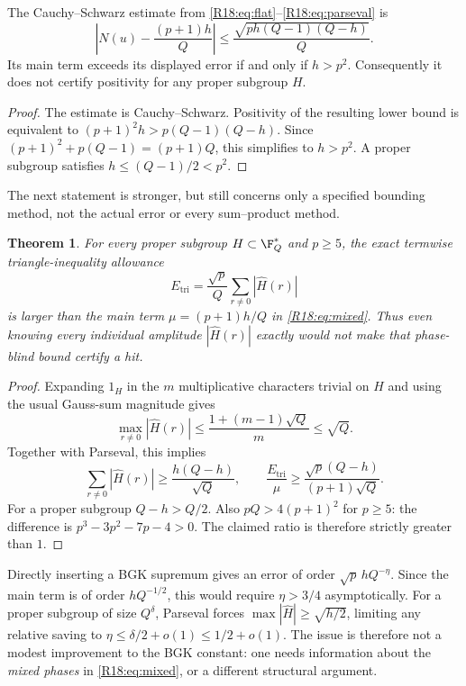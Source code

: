 \documentclass[11pt,a4paper]{article}
\newtheorem{theorem}{Theorem}[section]
\theoremstyle{definition}\newtheorem{definition}[theorem]{Definition}
\theoremstyle{remark}\newtheorem{remark}[theorem]{Remark}
\begin{document}
\begin{proposition}\label{R18:prop:cs}
The Cauchy--Schwarz estimate from \eqref{R18:eq:flat}--\eqref{R18:eq:parseval} is
\[
 \left|N(u)-\frac{(p+1)h}{Q}\right|
 \le\frac{\sqrt{ph(Q-1)(Q-h)}}{Q}.
\]
Its main term exceeds its displayed error if and only if $h>p^2$.
Consequently it does not certify positivity for any proper subgroup $H$.
\end{proposition}
\begin{proof}
The estimate is Cauchy--Schwarz. Positivity of the resulting lower bound
is equivalent to
$(p+1)^2h>p(Q-1)(Q-h)$.
Since $(p+1)^2+p(Q-1)=(p+1)Q$, this simplifies to $h>p^2$.
A proper subgroup satisfies $h\le(Q-1)/2<p^2$.
\end{proof}

The next statement is stronger, but still concerns only a specified
bounding method, not the actual error or every sum--product method.

\begin{theorem}\label{R18:thm:triangle}
For every proper subgroup $H\subset\F_Q^*$ and $p\ge5$, the exact
termwise triangle-inequality allowance
\[
 E_{\mathrm{tri}}=\frac{\sqrt p}{Q}
                       \sum_{r\ne0}|\widehat H(r)|
\]
is larger than the main term $\mu=(p+1)h/Q$ in \eqref{R18:eq:mixed}.
Thus even knowing every individual amplitude $|\widehat H(r)|$
exactly would not make that phase-blind bound certify a hit.
\end{theorem}
\begin{proof}
Expanding $1_H$ in the $m$ multiplicative characters trivial on $H$
and using the usual Gauss-sum magnitude gives
\[
 \max_{r\ne0}|\widehat H(r)|
 \le\frac{1+(m-1)\sqrt Q}{m}\le\sqrt Q.
\]
Together with Parseval, this implies
\[
 \sum_{r\ne0}|\widehat H(r)|\ge\frac{h(Q-h)}{\sqrt Q},\qquad
 \frac{E_{\mathrm{tri}}}{\mu}
 \ge\frac{\sqrt p(Q-h)}{(p+1)\sqrt Q}.
\]
For a proper subgroup $Q-h>Q/2$. Also $pQ>4(p+1)^2$ for $p\ge5$:
the difference is $p^3-3p^2-7p-4>0$. The claimed ratio is therefore
strictly greater than $1$.
\end{proof}

Directly inserting a BGK supremum gives an error of order
$\sqrt p\,hQ^{-\eta}$. Since the main term is of order
$hQ^{-1/2}$, this would require $\eta>3/4$ asymptotically.
For a proper subgroup of size $Q^\delta$, Parseval forces
$\max|\widehat H|\ge\sqrt{h/2}$, limiting any relative saving to
$\eta\le\delta/2+o(1)\le1/2+o(1)$.
The issue is therefore not a modest improvement to the BGK constant:
one needs information about the \emph{mixed phases} in
\eqref{R18:eq:mixed}, or a different structural argument.
\end{document}
